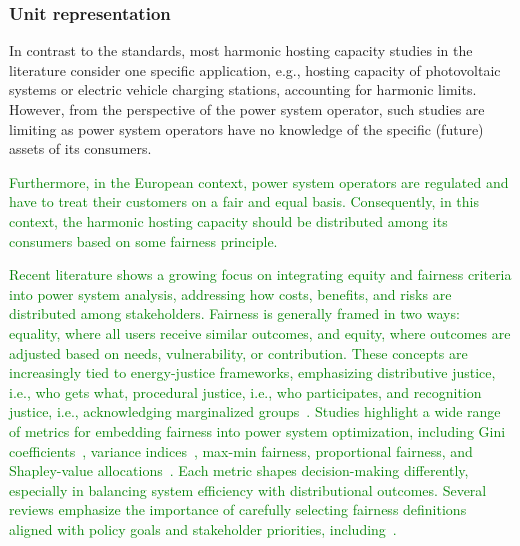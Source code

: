 
\subsubsection{Unit representation} 
\label{sec:unit_representation}

In contrast to the standards, most harmonic hosting capacity studies in the literature consider one specific application, e.g., hosting capacity of photovoltaic systems or electric vehicle charging stations, accounting for harmonic limits. However, from the perspective of the power system operator, such studies are limiting as power system operators have no knowledge of the specific (future) assets of its consumers. 

\textcolor{green}{Furthermore, in the European context, power system operators are regulated and have to treat their customers on a fair and equal basis. Consequently, in this context, the harmonic hosting capacity should be distributed among its consumers based on some fairness principle.}

\textcolor{green}{Recent literature shows a growing focus on integrating equity and fairness criteria into power system analysis, addressing how costs, benefits, and risks are distributed among stakeholders. Fairness is generally framed in two ways: equality, where all users receive similar outcomes, and equity, where outcomes are adjusted based on needs, vulnerability, or contribution. These concepts are increasingly tied to energy-justice frameworks, emphasizing distributive justice, i.e., who gets what, procedural justice, i.e., who participates, and recognition justice, i.e., acknowledging marginalized groups~\cite{goforth_incorporating_2025}. Studies highlight a wide range of metrics for embedding fairness into power system optimization, including Gini coefficients~\cite{sun_gini_2020}, variance indices~\cite{heylen_fairness_2019}, max-min fairness, proportional fairness, and Shapley-value allocations~\cite{obrien_shapley_2015}. Each metric shapes decision-making differently, especially in balancing system efficiency with distributional outcomes. Several reviews emphasize the importance of carefully selecting fairness definitions aligned with policy goals and stakeholder priorities, including~\cite{goforth_incorporating_2025}.}

